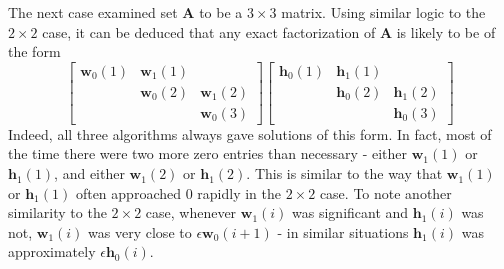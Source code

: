 \documentclass[conference]{IEEEtran}
\begin{document}
The next case examined set $ \mathbf{A} $ to be a $ 3 \times 3 $ matrix.  Using similar logic to the $ 2 \times 2 $ case, it can be deduced that any exact factorization of $ \mathbf{A} $ is likely to be of the form
\begin{equation}
\left[ \begin{array}{ccc} \mathbf{w}_0(1) & \mathbf{w}_1(1) & \\ & \mathbf{w}_0(2) & \mathbf{w}_1(2) \\ & & \mathbf{w}_0(3) \end{array} \right] \left[ \begin{array}{ccc} \mathbf{h}_0(1) & \mathbf{h}_1(1) & \\ & \mathbf{h}_0(2) & \mathbf{h}_1(2) \\ & & \mathbf{h}_0(3) \end{array} \right]
\end{equation}
Indeed, all three algorithms always gave solutions of this form.  In fact, most of the time there were two more zero entries than necessary - either $ \mathbf{w}_1(1) $ or $ \mathbf{h}_1(1) $, and either $ \mathbf{w}_1(2) $ or $ \mathbf{h}_1(2) $.  This is similar to the way that $ \mathbf{w}_1(1) $ or $ \mathbf{h}_1(1) $ often approached 0 rapidly in the $ 2 \times 2 $ case.  To note another similarity to the $ 2 \times 2 $ case, whenever $ \mathbf{w}_1(i) $ was significant and $ \mathbf{h}_1(i) $ was not, $ \mathbf{w}_1(i) $ was very close to $ \epsilon \mathbf{w}_0(i+1) $ - in similar situations $ \mathbf{h}_1(i) $ was approximately $ \epsilon \mathbf{h}_0(i) $.
\end{document}
